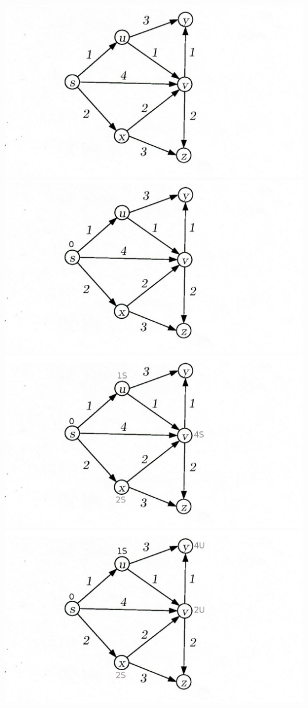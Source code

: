 \begin{frame}
	 {\includegraphics[scale=0.25]{./pictures/00_Graph}}
	\only<2> {\includegraphics[scale=0.25]{./pictures/01_Graph}}
	\only<3> {\includegraphics[scale=0.25]{./pictures/02_Graph}}
	\only<4> {\includegraphics[scale=0.25]{./pictures/03_Graph}}

\end{frame}
